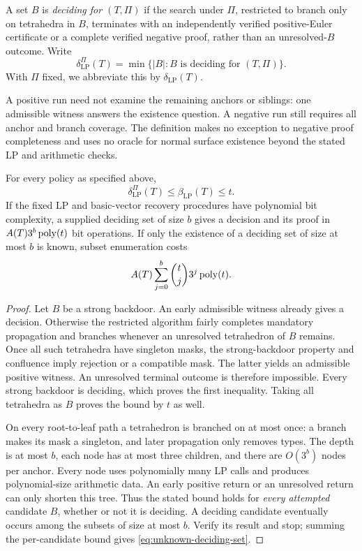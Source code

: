 \begin{definition}\label{def:deciding-set}
A set $B$ is \emph{deciding for $(T,\Pi)$} if the search under $\Pi$,
restricted to branch only on tetrahedra in $B$, terminates with an
independently verified positive-Euler certificate or a complete verified
negative proof, rather than an unresolved-$B$ outcome. Write
\[
 \delta_{\mathrm{LP}}^{\Pi}(T)
   =\min\{|B|:B\text{ is deciding for }(T,\Pi)\}.
\]
With $\Pi$ fixed, we abbreviate this by $\delta_{\mathrm{LP}}(T)$.
\end{definition}

A positive run need not examine the remaining anchors or siblings:
one admissible witness answers the existence question. A negative run
still requires all anchor and branch coverage. The definition makes no
exception to negative proof completeness and uses no oracle for normal
surface existence beyond the stated LP and arithmetic checks.

\begin{theorem}\label{thm:deciding-set}
For every policy as specified above,
\begin{equation}\label{eq:deciding-comparison}
 \delta_{\mathrm{LP}}^{\Pi}(T)
   \le\beta_{\mathrm{LP}}(T)\le t.
\end{equation}
If the fixed LP and basic-vector recovery procedures have polynomial
bit complexity, a supplied deciding set of size $b$ gives a decision
and its proof in $A(T)3^b\operatorname{poly}(t)$ bit operations. If only the existence
of a deciding set of size at most $b$ is known, subset enumeration costs
\begin{equation}\label{eq:unknown-deciding-set}
 A(T)\sum_{j=0}^{b}\binom tj3^j\operatorname{poly}(t).
\end{equation}
\end{theorem}
\begin{proof}
Let $B$ be a strong backdoor. An early admissible witness already gives
a decision. Otherwise the restricted algorithm fairly completes
mandatory propagation and branches whenever an unresolved tetrahedron
of $B$ remains. Once all such tetrahedra have singleton masks, the
strong-backdoor property and confluence imply rejection or a compatible
mask. The latter yields an admissible positive witness. An unresolved
terminal outcome is therefore impossible. Every strong backdoor is
deciding, which proves the first inequality. Taking all tetrahedra as
$B$ proves the bound by $t$ as well.

On every root-to-leaf path a tetrahedron is branched on at most once:
a branch makes its mask a singleton, and later propagation only removes
types. The depth is at most $b$, each node has at most three children,
and there are $O(3^b)$ nodes per anchor. Every node uses polynomially
many LP calls and produces polynomial-size arithmetic data. An early
positive return or an unresolved return can only shorten this tree.
Thus the stated bound holds for \emph{every attempted} candidate $B$,
whether or not it is deciding. A deciding candidate eventually occurs
among the subsets of size at most $b$. Verify its result and stop;
summing the per-candidate bound gives
\eqref{eq:unknown-deciding-set}.
\end{proof}

